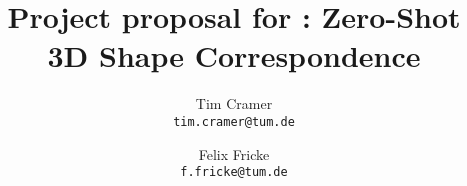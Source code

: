 \documentclass[10pt,twocolumn,letterpaper]{article}
\title{Project proposal for \confName: Zero-Shot 3D Shape Correspondence}
\author{Tim Cramer\\
{\tt\small tim.cramer@tum.de}
\and
Felix Fricke\\
{\tt\small f.fricke@tum.de}
}
\begin{document}
\maketitle
%     
% 
% 
% 




\newpage
{
    \small
    
    
}

% 
\end{document}
